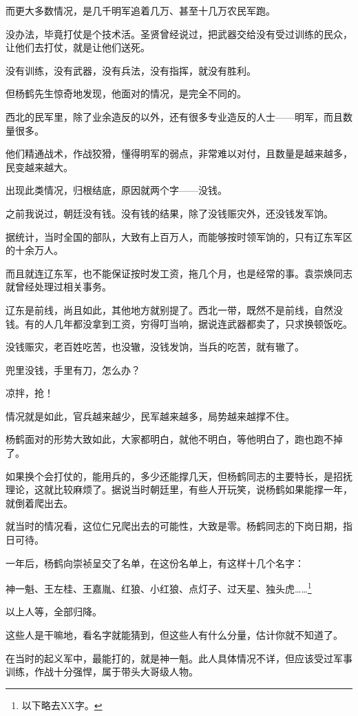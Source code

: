 \begin{multicols}{\theparacolNo}
		而更大多数情况，是几千明军追着几万、甚至十几万农民军跑。

		没办法，毕竟打仗是个技术活。圣贤曾经说过，把武器交给没有受过训练的民众，让他们去打仗，就是让他们送死。

		没有训练，没有武器，没有兵法，没有指挥，就没有胜利。

		但杨鹤先生惊奇地发现，他面对的情况，是完全不同的。

		西北的民军里，除了业余造反的以外，还有很多专业造反的人士——明军，而且数量很多。

		他们精通战术，作战狡猾，懂得明军的弱点，非常难以对付，且数量是越来越多，民变越来越大。

		出现此类情况，归根结底，原因就两个字——没钱。

		之前我说过，朝廷没有钱。没有钱的结果，除了没钱赈灾外，还没钱发军饷。

		据统计，当时全国的部队，大致有上百万人，而能够按时领军饷的，只有辽东军区的十余万人。

		而且就连辽东军，也不能保证按时发工资，拖几个月，也是经常的事。袁崇焕同志就曾经处理过相关事务。

		辽东是前线，尚且如此，其他地方就别提了。西北一带，既然不是前线，自然没钱。有的人几年都没拿到工资，穷得叮当响，据说连武器都卖了，只求换顿饭吃。

		没钱赈灾，老百姓吃苦，也没辙，没钱发饷，当兵的吃苦，就有辙了。

		兜里没钱，手里有刀，怎么办？

		凉拌，抢！

		情况就是如此，官兵越来越少，民军越来越多，局势越来越撑不住。

		杨鹤面对的形势大致如此，大家都明白，就他不明白，等他明白了，跑也跑不掉了。

		如果换个会打仗的，能用兵的，多少还能撑几天，但杨鹤同志的主要特长，是招抚理论，这就比较麻烦了。据说当时朝廷里，有些人开玩笑，说杨鹤如果能撑一年，就倒着爬出去。

		就当时的情况看，这位仁兄爬出去的可能性，大致是零。杨鹤同志的下岗日期，指日可待。

		一年后，杨鹤向崇祯呈交了名单，在这份名单上，有这样十几个名字：

		神一魁、王左桂、王嘉胤、红狼、小红狼、点灯子、过天星、独头虎……\footnote{以下略去XX字。}

		以上人等，全部归降。

		这些人是干嘛地，看名字就能猜到，但这些人有什么分量，估计你就不知道了。

		在当时的起义军中，最能打的，就是神一魁。此人具体情况不详，但应该受过军事训练，作战十分强悍，属于带头大哥级人物。


\end{multicols}
